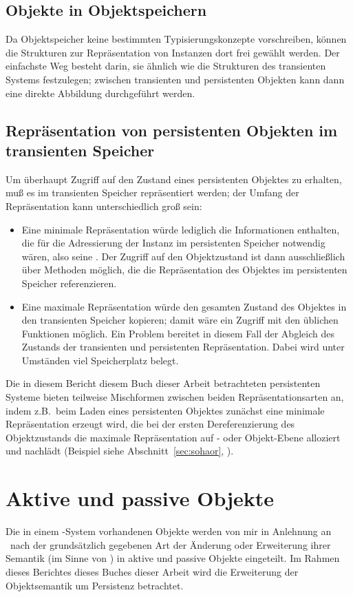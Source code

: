 \subsection{Objekte in Objektspeichern}
%
Da Objektspeicher keine bestimmten Typisierungskonzepte vorschreiben,
k\"{o}nnen die Strukturen zur Repr\"{a}sentation von Instanzen dort frei
gew\"{a}hlt werden. Der einfachste Weg besteht darin, sie \"{a}hnlich wie
die Strukturen des transienten Systems festzulegen; zwischen
transienten und persistenten Objekten kann dann eine direkte Abbildung
durchgef\"{u}hrt werden.
%
\subsection{Repr\"{a}sentation von persistenten Objekten im transienten
Speicher}%
\label{sec:porepr}
%
Um \"{u}berhaupt Zugriff auf den Zustand eines persistenten Objektes zu
erhalten, mu\ss{} es im transienten Speicher repr\"{a}sentiert werden;
der Umfang der Repr\"{a}sentation kann unterschiedlich gro\ss{} sein:
\begin{itemize}
%
\item Eine minimale Repr\"{a}sentation w\"{u}rde lediglich die Informationen
enthalten, die f\"{u}r die Adressierung der Instanz im persistenten
Speicher notwendig w\"{a}ren, also seine \objid. Der Zugriff auf den
Objektzustand ist dann ausschlie\ss{}lich \"{u}ber Methoden m\"{o}glich, die
die Repr\"{a}sentation des Objektes im persistenten Speicher
referenzieren.
%
\item Eine maximale Repr\"{a}sentation w\"{u}rde den gesamten Zustand des
Objektes in den transienten Speicher kopieren; damit w\"{a}re ein Zugriff
mit den \"{u}blichen Funktionen m\"{o}glich. Ein Problem bereitet in diesem
Fall der Abgleich des Zustands der transienten und persistenten
Repr\"{a}sentation. Dabei wird unter Umst\"{a}nden viel Speicherplatz
belegt.
%
\end{itemize}
Die in \ifbericht diesem Bericht \else\ifbuch diesem Buch \else dieser
Arbeit \fi\fi betrachteten persistenten Systeme bieten teilweise
Mischformen zwischen beiden Repr\"{a}sentationsarten an, indem z.B.\ 
beim Laden eines persistenten Objektes zun\"{a}chst eine minimale
Repr\"{a}sentation erzeugt wird, die bei der ersten Dereferenzierung
des Objektzustands die maximale Repr\"{a}sentation auf \Slt\/- oder
Objekt-Ebene alloziert und nachl\"{a}dt (Beispiel siehe
\ifbericht%
\cite[]{bib:ki94a}%
\else%
Abschnitt~\ref{sec:sohaor}, \citepage{\pageref{sec:sohaor}}%
\fi).
%
\section{Aktive und passive Objekte}
%
Die in einem \cl-System vorhandenen Objekte werden von mir in
Anlehnung an \cite[]{bib:fo88}\ nach der
grunds\"{a}tzlich gegebenen Art der \"{A}nderung oder Erweiterung
ihrer Semantik (im Sinne von \cite[\citepage{1}]{bib:amop91}) in
aktive und passive Objekte eingeteilt. Im Rahmen \ifbericht dieses
Berichtes \else\ifbuch dieses Buches \else dieser Arbeit \fi\fi wird
die Erweiterung der Objektsemantik um Persistenz betrachtet.
%

